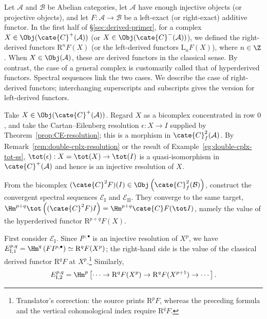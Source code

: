 \begin{example}
\label{eg:hyperderived-ss}
	Let $\mathcal{A}$ and $\mathcal{B}$ be Abelian categories, let
	$\mathcal{A}$ have enough injective objects (or projective objects), and let
	$F:\mathcal{A}\to\mathcal{B}$ be a left-exact (or right-exact) additive
	functor. In the first half of \S\ref{sec:derived-primer}, for a complex
	$X\in\Obj(\cate{C}^+(\mathcal{A}))$ (or
	$X\in\Obj(\cate{C}^-(\mathcal{A}))$), we defined the right-derived functors
	$\mathrm{R}^nF(X)$ (or the left-derived functors $\mathrm{L}_nF(X)$), where
	$n\in\Z$. When $X\in\Obj(\mathcal{A})$, these are derived functors in the
	classical sense. By contrast, the case of a general complex is customarily
	called that of hyperderived functors. Spectral sequences link the two cases.
	We describe the case of right-derived functors; interchanging superscripts
	and subscripts gives the version for left-derived functors.

	Take $X\in\Obj(\cate{C}^+(\mathcal{A}))$. Regard $X$ as a bicomplex
	concentrated in row $0$, and take the Cartan--Eilenberg resolution
	$\epsilon:X\to I$ supplied by Theorem~\ref{prop:CE-resolution}; this is a
	morphism in $\cate{C}^2_f(\mathcal{A})$. By
	Remark~\ref{rem:double-cplx-resolution} or the result of
	Example~\ref{eg:double-cplx-tot-ss},
	$\tot(\epsilon):X=\tot(X)\to\tot(I)$ is a quasi-isomorphism in
	$\cate{C}^+(\mathcal{A})$ and hence is an injective resolution of $X$.

	From the bicomplex
	$(\cate{C}^2F)(I)\in
	\Obj\left(\cate{C}^2_f(\mathcal{B})\right)$, construct the convergent
	spectral sequences $\mathscr{E}_{\mathrm{I}}$ and
	$\mathscr{E}_{\mathrm{II}}$. They converge to the same target,
	$\Hm^{p+q}\tot\left((\cate{C}^2F)I\right)
	=\Hm^{p+q}\cate{C}F(\tot I)$, namely the value of the hyperderived functor
	$\mathrm{R}^{p+q}F(X)$.

	First consider $\mathscr{E}_{\mathrm{I}}$. Since $I^{p,\bullet}$ is an
	injective resolution of $X^p$, we have
	$E_{\mathrm{I},1}^{p,q}=\Hm^q\left(FI^{p,\bullet}\right)
	\simeq\mathrm{R}^qF(X^p)$; the right-hand side is the value of the classical
	derived functor $\mathrm{R}^qF$ at $X^p$.\footnote{Translator's correction:
	the source prints $\mathrm{R}^pF$, whereas the preceding formula and the
	vertical cohomological index require $\mathrm{R}^qF$.} Similarly,
	\[ E_{\mathrm{I}, 2}^{p,q} = \Hm^p\left[ \cdots \to \mathrm{R}^q F(X^p) \to \mathrm{R}^q F(X^{p+1}) \to \cdots \right]. \]


\end{example}

